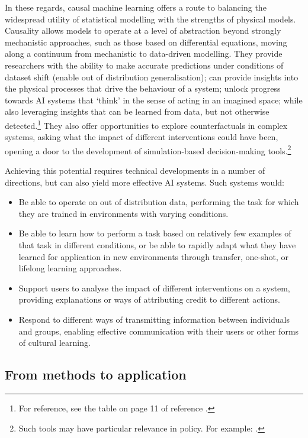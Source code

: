 In these regards, causal machine learning offers a route to balancing
the widespread utility of statistical modelling with the strengths of
physical models. Causality allows models to operate at a level of
abstraction beyond strongly mechanistic approaches, such as those based
on differential equations, moving along a continuum from mechanistic to
data-driven modelling. They provide researchers with the ability to make
accurate predictions under conditions of dataset shift (enable out of
distribution generalisation); can provide insights into the physical
processes that drive the behaviour of a system; unlock progress towards
AI systems that `think' in the sense of acting in an imagined space;
while also leveraging insights that can be learned from data, but not
otherwise detected.\footnote{For reference, see the table on page 11 of
  reference \cite{Scholkopf-causality22}.} They also offer opportunities to explore
counterfactuals in complex systems, asking what the impact of different
interventions could have been, opening a door to the development of
simulation-based decision-making tools.\footnote{Such tools may have
  particular relevance in policy. For example: \cite{Mastakouri-causal20}.}

Achieving this potential requires technical developments in a number of
directions, but can also yield more effective AI systems. Such systems
would:

\begin{itemize}
\item
  Be able to operate on out of distribution data, performing the task
  for which they are trained in environments with varying conditions.
\item
  Be able to learn how to perform a task based on relatively few
  examples of that task in different conditions, or be able to rapidly
  adapt what they have learned for application in new environments
  through transfer, one-shot, or lifelong learning approaches.
\item
  Support users to analyse the impact of different interventions on a
  system, providing explanations or ways of attributing credit to
  different actions.
\item
  Respond to different ways of transmitting information between
  individuals and groups, enabling effective communication with their
  users or other forms of cultural learning.
\end{itemize}

\subsection{From methods to
application}\label{from-methods-to-application}

